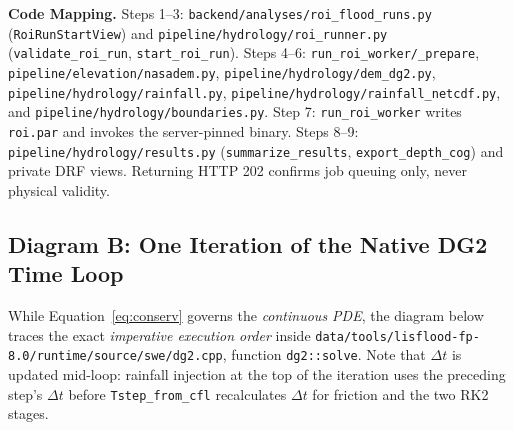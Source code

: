 \documentclass[11pt,a4paper]{article}
\newcommand{\src}[1]{\nolinkurl{#1}}
\begin{document}
\noindent\textbf{Code Mapping.} Steps 1--3: \src{backend/analyses/roi_flood_runs.py} (\texttt{RoiRunStartView}) and \src{pipeline/hydrology/roi_runner.py} (\src{validate_roi_run}, \src{start_roi_run}). Steps 4--6: \src{run_roi_worker/_prepare}, \src{pipeline/elevation/nasadem.py}, \src{pipeline/hydrology/dem_dg2.py}, \src{pipeline/hydrology/rainfall.py}, \src{pipeline/hydrology/rainfall_netcdf.py}, and \src{pipeline/hydrology/boundaries.py}. Step 7: \texttt{run\_roi\_worker} writes \texttt{roi.par} and invokes the server-pinned binary. Steps 8--9: \src{pipeline/hydrology/results.py} (\texttt{summarize\_results}, \texttt{export\_depth\_cog}) and private DRF views. Returning HTTP 202 confirms job queuing only, never physical validity.

\newpage
\subsection{Diagram B: One Iteration of the Native DG2 Time Loop}
\label{sec:flujo-nativo}
While Equation~\eqref{eq:conserv} governs the \emph{continuous PDE}, the diagram below traces the exact \emph{imperative execution order} inside \src{data/tools/lisflood-fp-8.0/runtime/source/swe/dg2.cpp}, function \texttt{dg2::solve}. Note that $\Delta t$ is updated mid-loop: rainfall injection at the top of the iteration uses the preceding step's $\Delta t$ before \texttt{Tstep\_from\_cfl} recalculates $\Delta t$ for friction and the two RK2 stages.
\end{document}
